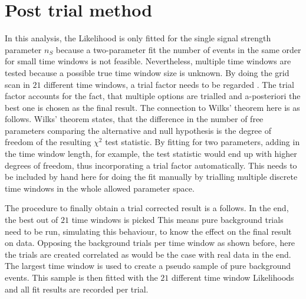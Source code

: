 \section{Post trial method}
In this analysis, the Likelihood is only fitted for the single signal strength parameter $n_S$ because a two-parameter fit the number of events in the same order for small time windows is not feasible.
Nevertheless, multiple time windows are tested because a possible true time window size is unknown.
By doing the grid scan in $\num{21}$ different time windows, a trial factor needs to be regarded .
The trial factor accounts for the fact, that multiple options are trialled and a-posteriori the best one is chosen as the final result.
The connection to Wilks' theorem here is as follows.
Wilks' theorem states, that the difference in the number of free parameters comparing the alternative and null hypothesis is the degree of freedom of the resulting $\chi^2$ test statistic.
By fitting for two parameters, adding in the time window length, for example, the test statistic would end up with higher degrees of freedom, thus incorporating a trial factor automatically.
This needs to be included by hand here for doing the fit manually by trialling multiple discrete time windows in the whole allowed parameter space.

The procedure to finally obtain a trial corrected result is a follows.
In the end, the best out of $\num{21}$ time windows is picked
This means pure background trials need to be run, simulating this behaviour, to know the effect on the final result on data.
Opposing the background trials per time window as shown before, here the trials are created correlated as would be the case with real data in the end.
The largest time window is used to create a pseudo sample of pure background events.
This sample is then fitted with the $\num{21}$ different time window Likelihoods and all fit results are recorded per trial.

